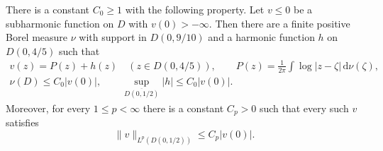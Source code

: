 \begin{lemma}\label{lem:negative-subharmonic-disc-lp}
There is a constant $C_0\geq1$ with the following property. Let $v\leq0$ be a subharmonic function on $D$ with $v(0)>-\infty$. Then there are a finite positive Borel measure $\nu$ with support in $D(0,9/10)$ and a harmonic function $h$ on $D(0,4/5)$ such that
\begin{equation}\label{eq:negative-subharmonic-disc-riesz-bounds}
 \begin{gathered}
 v(z)=P(z)+h(z)\quad(z\in D(0,4/5)),\qquad P(z)=\frac1{2\pi}\int\log|z-\zeta|\,\mathrm d\nu(\zeta),\\
 \nu(D)\leq C_0|v(0)|,\qquad\sup_{\overline{D(0,1/2)}}|h|\leq C_0|v(0)|.
 \end{gathered}
\end{equation}
Moreover, for every $1\leq p<\infty$ there is a constant $C_p>0$ such that every such $v$ satisfies
\[
 \|v\|_{L^p(D(0,1/2))}\leq C_p|v(0)|.
\]
\end{lemma}
